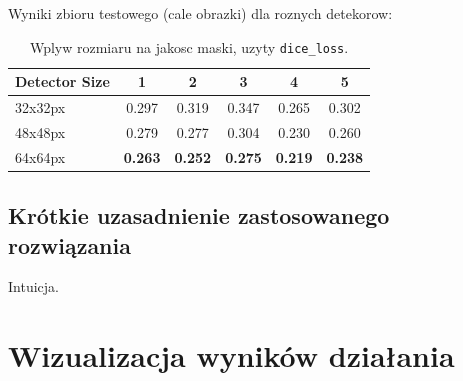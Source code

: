 \documentclass{bmvc2k}
\begin{document}
Wyniki zbioru testowego (cale obrazki) dla roznych detekorow:

\begin{table}[H]
\begin{center}
\begin{tabular}{|l|c|c|c|c|c|}
\hline
Detector Size & 1 & 2 & 3 & 4 & 5  \\
\hline\hline
32x32px & 0.297 & 0.319 & 0.347 & 0.265 & 0.302 \\
48x48px & 0.279 & 0.277 & 0.304 & 0.230 & 0.260 \\
64x64px & \textbf{0.263} & \textbf{0.252} & \textbf{0.275} & \textbf{0.219} & \textbf{0.238} \\
\hline
\end{tabular}
\end{center}
\caption{Wplyw rozmiaru na jakosc maski, uzyty {\tt dice\_loss}.}
\end{table}

\subsection{Krótkie uzasadnienie zastosowanego rozwiązania}

Intuicja.

\section{Wizualizacja wyników działania}
\end{document}
